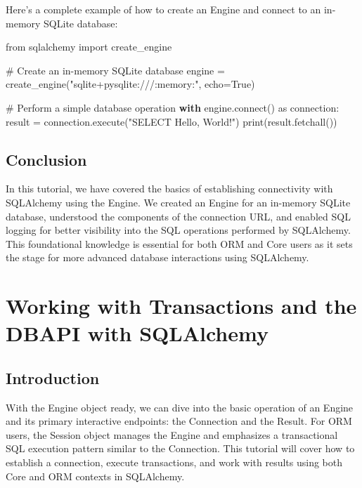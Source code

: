 \documentclass[
  letterpaper,
  DIV=11,
  numbers=noendperiod]{scrreprt}
\newenvironment{Shaded}{\begin{snugshade}}{\end{snugshade}}
\newcommand{\BuiltInTok}[1]{\textcolor[rgb]{0.00,0.23,0.31}{#1}}
\newcommand{\CommentTok}[1]{\textcolor[rgb]{0.37,0.37,0.37}{#1}}
\newcommand{\ControlFlowTok}[1]{\textcolor[rgb]{0.00,0.23,0.31}{\textbf{#1}}}
\newcommand{\ExtensionTok}[1]{\textcolor[rgb]{0.00,0.23,0.31}{#1}}
\newcommand{\ImportTok}[1]{\textcolor[rgb]{0.00,0.46,0.62}{#1}}
\newcommand{\NormalTok}[1]{\textcolor[rgb]{0.00,0.23,0.31}{#1}}
\newcommand{\OperatorTok}[1]{\textcolor[rgb]{0.37,0.37,0.37}{#1}}
\newcommand{\StringTok}[1]{\textcolor[rgb]{0.13,0.47,0.30}{#1}}
\newcommand{\VariableTok}[1]{\textcolor[rgb]{0.07,0.07,0.07}{#1}}
\begin{document}
Here's a complete example of how to create an Engine and connect to an
in-memory SQLite database:

\begin{Shaded}
\begin{Highlighting}[]
\ImportTok{from}\NormalTok{ sqlalchemy }\ImportTok{import}\NormalTok{ create\_engine}

\CommentTok{\# Create an in{-}memory SQLite database}
\NormalTok{engine }\OperatorTok{=}\NormalTok{ create\_engine(}\StringTok{"sqlite+pysqlite:///:memory:"}\NormalTok{, echo}\OperatorTok{=}\VariableTok{True}\NormalTok{)}

\CommentTok{\# Perform a simple database operation}
\ControlFlowTok{with}\NormalTok{ engine.}\ExtensionTok{connect}\NormalTok{() }\ImportTok{as}\NormalTok{ connection:}
\NormalTok{    result }\OperatorTok{=}\NormalTok{ connection.execute(}\StringTok{"SELECT \textquotesingle{}Hello, World!\textquotesingle{}"}\NormalTok{)}
    \BuiltInTok{print}\NormalTok{(result.fetchall())}
\end{Highlighting}
\end{Shaded}

\subsection{Conclusion}\label{conclusion-16}

In this tutorial, we have covered the basics of establishing
connectivity with SQLAlchemy using the Engine. We created an Engine for
an in-memory SQLite database, understood the components of the
connection URL, and enabled SQL logging for better visibility into the
SQL operations performed by SQLAlchemy. This foundational knowledge is
essential for both ORM and Core users as it sets the stage for more
advanced database interactions using SQLAlchemy.

\section{Working with Transactions and the DBAPI with
SQLAlchemy}\label{working-with-transactions-and-the-dbapi-with-sqlalchemy}

\subsection{Introduction}\label{introduction-1}

With the Engine object ready, we can dive into the basic operation of an
Engine and its primary interactive endpoints: the Connection and the
Result. For ORM users, the Session object manages the Engine and
emphasizes a transactional SQL execution pattern similar to the
Connection. This tutorial will cover how to establish a connection,
execute transactions, and work with results using both Core and ORM
contexts in SQLAlchemy.
\end{document}

